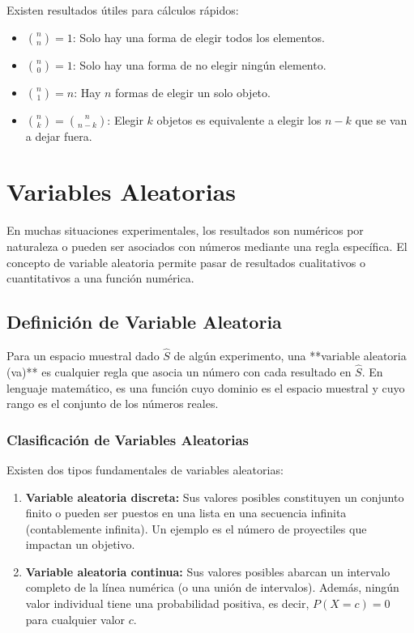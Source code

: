\documentclass[a4paper]{article}
\begin{document}
Existen resultados útiles para cálculos rápidos:
\begin{itemize}
    \item $\binom{n}{n} = 1$: Solo hay una forma de elegir todos los elementos.
    \item $\binom{n}{0} = 1$: Solo hay una forma de no elegir ningún elemento.
    \item $\binom{n}{1} = n$: Hay $n$ formas de elegir un solo objeto.
    \item $\binom{n}{k} = \binom{n}{n-k}$: Elegir $k$ objetos es equivalente a elegir los $n-k$ que se van a dejar fuera.
\end{itemize}

\section{Variables Aleatorias}

En muchas situaciones experimentales, los resultados son numéricos por naturaleza o pueden ser asociados con números mediante una regla específica. El concepto de variable aleatoria permite pasar de resultados cualitativos o cuantitativos a una función numérica.

\subsection{Definición de Variable Aleatoria}

Para un espacio muestral dado $\hat{S}$ de algún experimento, una **variable aleatoria (va)** es cualquier regla que asocia un número con cada resultado en $\hat{S}$. En lenguaje matemático, es una función cuyo dominio es el espacio muestral y cuyo rango es el conjunto de los números reales.

\subsubsection{Clasificación de Variables Aleatorias}

Existen dos tipos fundamentales de variables aleatorias:
\begin{enumerate}
    \item \textbf{Variable aleatoria discreta:} Sus valores posibles constituyen un conjunto finito o pueden ser puestos en una lista en una secuencia infinita (contablemente infinita). Un ejemplo es el número de proyectiles que impactan un objetivo.
    \item \textbf{Variable aleatoria continua:} Sus valores posibles abarcan un intervalo completo de la línea numérica (o una unión de intervalos). Además, ningún valor individual tiene una probabilidad positiva, es decir, $P(X = c) = 0$ para cualquier valor $c$.
\end{enumerate}
\end{document}
